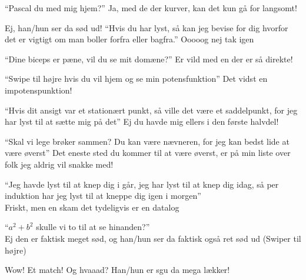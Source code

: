 \documentclass[a4paper,11pt]{article}
\begin{document}
\begin{sketch}

  ``Pascal du med mig hjem?'' Ja, med de der kurver, kan det kun gå for langsomt!


  Ej, han/hun ser da sød ud!  ``Hvis du har lyst, så kan jeg bevise for dig hvorfor det er vigtigt om man boller forfra eller bagfra.'' Ooooog nej tak igen


 ``Dine biceps er pæne, vil du se mit domæne?'' Er vild med en der er så direkte!


 ``Swipe til højre hvis du vil hjem og se min potensfunktion'' Det vidst en impotenspunktion!


 ``Hvis dit ansigt var et stationært punkt, så ville det være et saddelpunkt, for jeg har lyst til at sætte mig på det'' Ej du havde mig ellers i den første halvdel!


 ``Skal vi lege brøker sammen? Du kan være nævneren, for jeg kan bedst lide at være øverst'' Det eneste sted du kommer til at være øverst, er på min liste over folk jeg aldrig vil snakke med!


 ``Jeg havde lyst til at knep dig i går, jeg har lyst til at knep dig idag, så per induktion har jeg lyst til at kneppe dig igen i morgen'' \\
Friskt, men en skam det tydeligvis er en datalog


 ``$a^2 + b^2$ skulle vi to til at se hinanden?'' \\
Ej den er faktisk meget sød, og han/hun ser da faktisk også ret sød ud (Swiper til højre)


 Wow! Et match! Og hvaaad? Han/hun er sgu da mega lækker!


\end{sketch}
\end{document}
